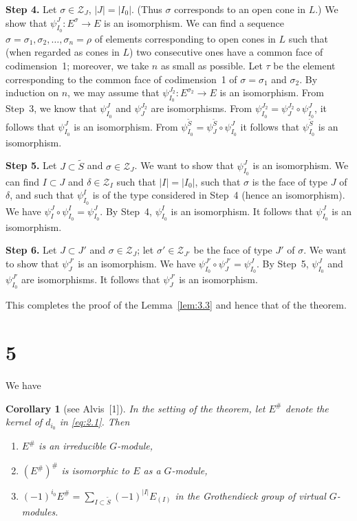 \documentclass[12pt,a4paper]{article}
\theoremstyle{plain}
\newtheorem{corollary}{Corollary}
\theoremstyle{definition}
\theoremstyle{remark}
\providecommand{\cZ}{\mathcal{Z}}
\begin{document}
\smallskip
\noindent\textbf{Step 4.} Let $\sigma \in \cZ_J$, $|J| = |I_0|$. (Thus $\sigma$ corresponds to an open cone in $L$.) We show that $\psi_{I_0}^{J} \colon E^\sigma \to E$ is an isomorphism. We can find a sequence $\sigma = \sigma_1, \sigma_2, \dots, \sigma_n = \rho$ of elements corresponding to open cones in $L$ such that (when regarded as cones in $L$) two consecutive ones have a common face of codimension~1; moreover, we take $n$ as small as possible. Let $\tau$ be the element corresponding to the common face of codimension~1 of $\sigma = \sigma_1$ and $\sigma_2$. By induction on $n$, we may assume that $\psi_{I_0}^{J_2} \colon E^{\sigma_2} \to E$ is an isomorphism. From Step~3, we know that $\psi_{I_0}^{J}$ and $\psi_{J}^{J_2}$ are isomorphisms. From $\psi_{I_0}^{J_2} = \psi_{J}^{J_2} \circ \psi_{I_0}^{J}$, it follows that $\psi_{I_0}^{J}$ is an isomorphism. From $\psi_{I_0}^{\tilde{S}} = \psi_{J}^{\tilde{S}} \circ \psi_{I_0}^{J}$ it follows that $\psi_{I_0}^{\tilde{S}}$ is an isomorphism.

\smallskip
\noindent\textbf{Step 5.} Let $J \subset \tilde{S}$ and $\sigma \in \cZ_J$. We want to show that $\psi_{I_0}^{J}$ is an isomorphism. We can find $I \subset J$ and $\delta \in \cZ_I$ such that $|I| = |I_0|$, such that $\sigma$ is the face of type $J$ of $\delta$, and such that $\psi_{I_0}^{I}$ is of the type considered in Step~4 (hence an isomorphism). We have $\psi_{I}^{J} \circ \psi_{I_0}^{I} = \psi_{I_0}^{J}$. By Step~4, $\psi_{I_0}^{I}$ is an isomorphism. It follows that $\psi_{I_0}^{J}$ is an isomorphism.

\smallskip
\noindent\textbf{Step 6.} Let $J \subset J'$ and $\sigma \in \cZ_J$; let $\sigma' \in \cZ_{J'}$ be the face of type $J'$ of $\sigma$. We want to show that $\psi_{J}^{J'}$ is an isomorphism. We have $\psi_{I_0}^{J'} \circ \psi_{J}^{J'} = \psi_{I_0}^{J}$. By Step~5, $\psi_{I_0}^{J}$ and $\psi_{I_0}^{J'}$ are isomorphisms. It follows that $\psi_{J}^{J'}$ is an isomorphism.

This completes the proof of the Lemma~\ref{lem:3.3} and hence that of the theorem.

\section*{5}

We have

\begin{corollary}[see Alvis~{[1]}]
In the setting of the theorem, let $E^\#$ denote the kernel of $d_{i_0}$ in \eqref{eq:2.1}. Then
\begin{enumerate}[label=(\alph*)]
\item $E^\#$ is an irreducible $G$-module,
\item $(E^\#)^\#$ is isomorphic to $E$ as a $G$-module,
\item $(-1)^{i_0} E^\# = \sum_{I \subset \tilde{S}} (-1)^{|I|} E_{(I)}$ in the Grothendieck group of virtual $G$-modules.
\end{enumerate}
\end{corollary}
\end{document}
